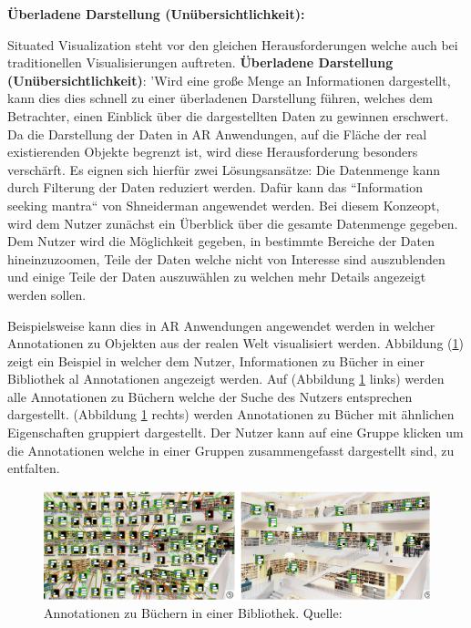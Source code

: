 \textbf{Überladene Darstellung (Unübersichtlichkeit):}

\cite[S.~241]{DieterSchmalstieg2016} Situated Visualization steht vor den gleichen Herausforderungen welche auch bei traditionellen Visualisierungen auftreten. 
\textbf{Überladene Darstellung (Unübersichtlichkeit)}: 'Wird eine große Menge an Informationen dargestellt, kann dies dies schnell zu einer überladenen Darstellung führen, welches dem Betrachter, einen Einblick 
über die dargestellten Daten zu gewinnen erschwert. Da die Darstellung der Daten in AR Anwendungen, auf die Fläche der real existierenden Objekte begrenzt ist, 
wird diese Herausforderung besonders verschärft. Es eignen sich hierfür zwei Lösungsansätze: Die Datenmenge kann durch Filterung der Daten reduziert werden. 
Dafür kann das ``Information seeking mantra`` von Shneiderman \cite{Shneiderman1996} angewendet werden. 
Bei diesem Konzeopt, wird dem Nutzer zunächst ein Überblick über die gesamte Datenmenge gegeben. Dem Nutzer wird die Möglichkeit gegeben, in bestimmte Bereiche der Daten hineinzuzoomen, Teile der Daten 
welche nicht von Interesse sind auszublenden und einige Teile der Daten auszuwählen zu welchen mehr Details angezeigt werden sollen. 

Beispielsweise kann dies in AR Anwendungen angewendet werden in welcher Annotationen zu Objekten aus der realen Welt visualisiert werden. 
Abbildung (\ref{img:annotation_clutter}) zeigt ein Beispiel in welcher dem Nutzer, Informationen zu Bücher in einer Bibliothek al Annotationen angezeigt werden. Auf (Abbildung \ref{img:annotation_clutter} links) werden 
alle Annotationen zu Büchern welche der Suche des Nutzers entsprechen dargestellt. (Abbildung \ref{img:annotation_clutter} rechts) werden Annotationen zu Bücher mit ähnlichen Eigenschaften gruppiert dargestellt. 
Der Nutzer kann auf eine Gruppe klicken um die Annotationen welche in einer Gruppen zusammengefasst dargestellt sind, zu entfalten. 

\begin{figure}[H]
	\centering
	\includegraphics[width=1.0\textwidth]{resources/fundamentals/annotations_clutter.png}
	\caption{Annotationen zu Büchern in einer Bibliothek. Quelle: \cite[S.~1]{Tatzgern2016}}
	\label{img:annotation_clutter}
\end{figure}

